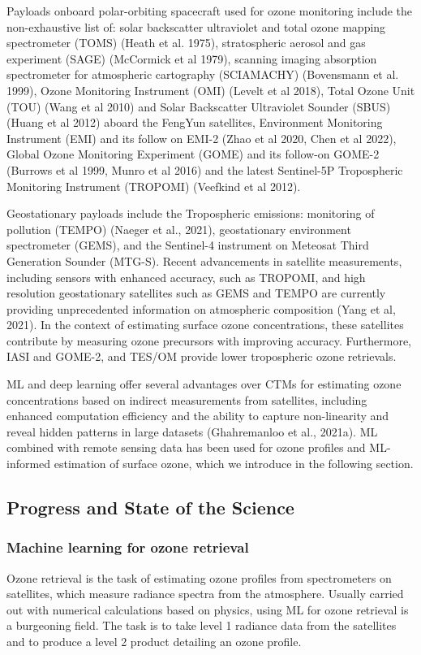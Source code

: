 \documentclass[gmd, manuscript]{copernicus}
\begin{document}
Payloads onboard polar-orbiting spacecraft used for ozone monitoring include the non-exhaustive list of: solar backscatter ultraviolet and total ozone mapping spectrometer (TOMS) (Heath et al. 1975), stratospheric aerosol and gas experiment (SAGE) (McCormick et al 1979), scanning imaging absorption spectrometer for atmospheric cartography (SCIAMACHY) (Bovensmann et al. 1999), Ozone Monitoring Instrument (OMI) (Levelt et al 2018), Total Ozone Unit (TOU) (Wang et al 2010) and Solar Backscatter Ultraviolet Sounder (SBUS) (Huang et al 2012) aboard the FengYun satellites, Environment Monitoring Instrument (EMI) and its follow on EMI-2 (Zhao et al 2020, Chen et al 2022), Global Ozone Monitoring Experiment (GOME) and its follow-on GOME-2 (Burrows et al 1999, Munro et al 2016) and the latest Sentinel-5P Tropospheric Monitoring Instrument (TROPOMI) (Veefkind et al 2012).

Geostationary payloads include the Tropospheric emissions: monitoring of pollution (TEMPO) (Naeger et al., 2021), geostationary environment spectrometer (GEMS), and the Sentinel-4 instrument on Meteosat Third Generation Sounder (MTG-S). Recent advancements in satellite measurements, including sensors with enhanced accuracy, such as TROPOMI, and high resolution geostationary satellites such as GEMS and TEMPO are currently providing unprecedented information on atmospheric composition (Yang et al, 2021). In the context of estimating surface ozone concentrations, these satellites contribute by measuring ozone precursors with improving accuracy. Furthermore, IASI and GOME-2, and TES/OM provide lower tropospheric ozone retrievals. 

ML and deep learning offer several advantages over CTMs for estimating ozone concentrations based on indirect measurements from satellites, including enhanced computation efficiency and the ability to capture non-linearity and reveal hidden patterns in large datasets (Ghahremanloo et al., 2021a). ML combined with remote sensing data has been used for ozone profiles and ML-informed estimation of surface ozone, which we introduce in the following section.
\subsection{Progress and State of the Science}
\subsubsection{Machine learning for ozone retrieval}
Ozone retrieval is the task of estimating ozone profiles from spectrometers on satellites, which measure radiance spectra from the atmosphere. Usually carried out with numerical calculations based on physics, using ML for ozone retrieval is a burgeoning field. The task is to take level 1 radiance data from the satellites and to produce a level 2 product detailing an ozone profile.
\end{document}
